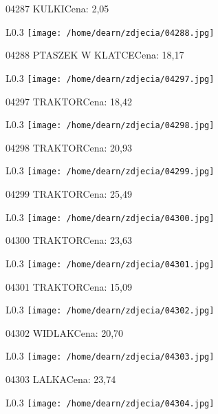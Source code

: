 04287 KULKICena: 2,05\newline
\begin{wrapfigure}{L}{0.3\textwidth}
\texttt{[image: /home/dearn/zdjecia/04288.jpg]}
\end{wrapfigure}
04288 PTASZEK W KLATCECena: 18,17\newline
\begin{wrapfigure}{L}{0.3\textwidth}
\texttt{[image: /home/dearn/zdjecia/04297.jpg]}
\end{wrapfigure}
04297 TRAKTORCena: 18,42\newline
\begin{wrapfigure}{L}{0.3\textwidth}
\texttt{[image: /home/dearn/zdjecia/04298.jpg]}
\end{wrapfigure}
04298 TRAKTORCena: 20,93\newline
\begin{wrapfigure}{L}{0.3\textwidth}
\texttt{[image: /home/dearn/zdjecia/04299.jpg]}
\end{wrapfigure}
04299 TRAKTORCena: 25,49\newline
\begin{wrapfigure}{L}{0.3\textwidth}
\texttt{[image: /home/dearn/zdjecia/04300.jpg]}
\end{wrapfigure}
04300 TRAKTORCena: 23,63\newline
\begin{wrapfigure}{L}{0.3\textwidth}
\texttt{[image: /home/dearn/zdjecia/04301.jpg]}
\end{wrapfigure}
04301 TRAKTORCena: 15,09\newline
\begin{wrapfigure}{L}{0.3\textwidth}
\texttt{[image: /home/dearn/zdjecia/04302.jpg]}
\end{wrapfigure}
04302 WIDLAKCena: 20,70\newline
\begin{wrapfigure}{L}{0.3\textwidth}
\texttt{[image: /home/dearn/zdjecia/04303.jpg]}
\end{wrapfigure}
04303 LALKACena: 23,74\newline
\begin{wrapfigure}{L}{0.3\textwidth}
\texttt{[image: /home/dearn/zdjecia/04304.jpg]}
\end{wrapfigure}
